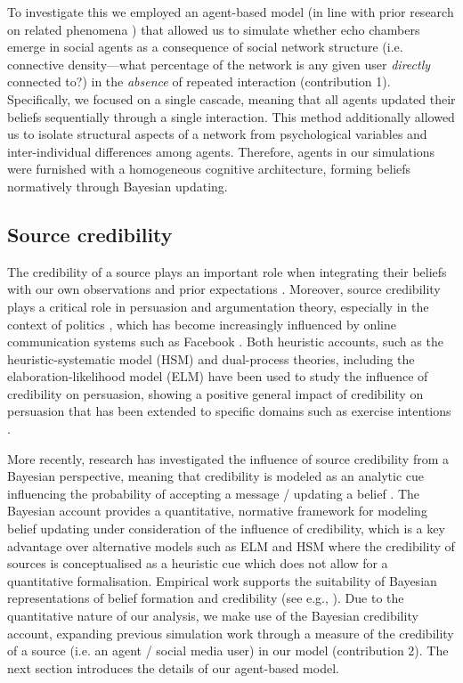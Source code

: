 \documentclass[fleqn,10pt]{wlscirep}
\begin{document}
To investigate this we employed an agent-based model (in line with prior research on related phenomena \cite{madsen2017growing, madsen2018large}) that allowed us to simulate whether echo chambers emerge in social agents as a consequence of social network structure (i.e. connective density---what percentage of the network is any given user \textit{directly} connected to?) in the \emph{absence} of repeated interaction (contribution 1). Specifically, we focused on a single cascade, meaning that all agents updated their beliefs sequentially through a single interaction. This method additionally allowed us to isolate structural aspects of a network from psychological variables and inter-individual differences among agents. Therefore, agents in our simulations were furnished with a homogeneous cognitive architecture, forming beliefs normatively through Bayesian updating. 

\subsection*{Source credibility}
The credibility of a source plays an important role when integrating their beliefs with our own observations and prior expectations \cite{cuddy2011dynamics, fiske2007universal}. Moreover, source credibility plays a critical role in persuasion and argumentation theory, especially in the context of politics \cite{housholder2014facebook, robinson1999measures, cialdini1993influence}, which has become increasingly influenced by online communication systems such as Facebook \cite{bail2016combining}. Both heuristic accounts, such as the heuristic-systematic model (HSM) \cite{chaiken1999heuristic} and dual-process theories, including the elaboration-likelihood model (ELM) \cite{petty1986elaboration} have been used to study the influence of credibility on persuasion, showing a positive general impact of credibility on persuasion \cite{chaiken1994heuristic} that has been extended to specific domains such as exercise intentions \cite{jones2003effects}. 

More recently, research has investigated the influence of source credibility from a Bayesian perspective, meaning that credibility is modeled as an analytic cue influencing the probability of accepting a message / updating a belief \cite{bovens2003bayesian, hahn2009argument, harris2009bayesian, oaksford2007bayesian}. The Bayesian account provides a quantitative, normative framework for modeling belief updating under consideration of the influence of credibility, which is a key advantage over alternative models such as ELM and HSM where the credibility of sources is conceptualised as a heuristic cue which does not allow for a quantitative formalisation. Empirical work supports the suitability of Bayesian representations of belief formation and credibility (see e.g., \cite{harris2016appeal}). Due to the quantitative nature of our analysis, we make use of the Bayesian credibility account, expanding previous simulation work \cite{madsen2017growing, madsen2018large} through a measure of the credibility of a source (i.e. an agent / social media user) in our model (contribution 2). The next section introduces the details of our agent-based model.
\end{document}
